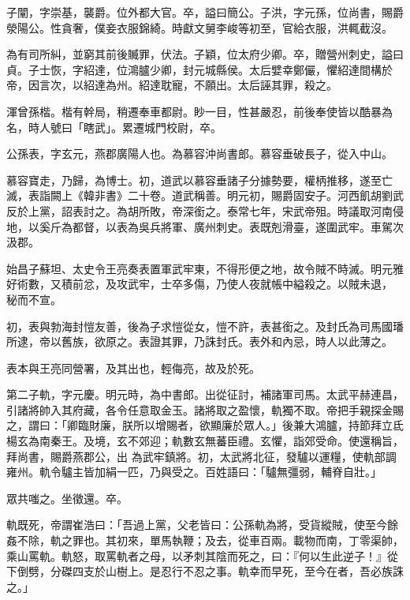 \begin{pinyinscope}
 子闡，字崇基，襲爵。位外都大官。卒，謚曰簡公。子洪，字元孫，位尚書，賜爵滎陽公。性貪奢，僕妾衣服錦綺。時獻文舅李峻等初至，官給衣服，洪輒截沒。



 為有司所糾，並窮其前後贓罪，伏法。子穎，位太府少卿。卒，贈營州刺史，謚曰貞。子士恢，字紹達，位鴻臚少卿，封元城縣侯。太后嬖幸鄭儼，懼紹達間構於帝，因言次，以紹達為州。紹達耽寵，不願出。太后誣其罪，殺之。



 渾曾孫楷。楷有幹局，稍遷奉車都尉。眇一目，性甚嚴忍，前後奉使皆以酷暴為名，時人號曰「瞎武」。累遷城門校尉，卒。



 公孫表，字玄元，燕郡廣陽人也。為慕容沖尚書郎。慕容垂破長子，從入中山。



 慕容寶走，乃歸，為博士。初，道武以慕容垂諸子分據勢要，權柄推移，遂至亡滅，表詣闕上《韓非書》二十卷。道武稱善。明元初，賜爵固安子。河西飢胡劉武反於上黨，詔表討之。為胡所敗，帝深銜之。泰常七年，宋武帝殂。時議取河南侵地，以奚斤為都督，以表為吳兵將軍、廣州刺史。表既剋滑臺，遂圍武牢。車駕次汲郡。



 始昌子蘇坦、太史令王亮奏表置軍武牢東，不得形便之地，故令賊不時滅。明元雅好術數，又積前忿，及攻武牢，士卒多傷，乃使人夜就帳中縊殺之。以賊未退，
 秘而不宣。



 初，表與勃海封愷友善，後為子求愷從女，愷不許，表甚銜之。及封氏為司馬國璠所逮，帝以舊族，欲原之。表證其罪，乃誅封氏。表外和內忌，時人以此薄之。



 表本與王亮同營署，及其出也，輕侮亮，故及於死。



 第二子軌，字元慶。明元時，為中書郎。出從征討，補諸軍司馬。太武平赫連昌，引諸將帥入其府藏，各令任意取金玉。諸將取之盈懷，軌獨不取。帝把手親探金賜之，謂曰：「卿臨財廉，朕所以增賜者，欲顯廉於眾人。」後兼大鴻臚，持節拜立氐楊玄為南秦王。及境，玄不郊迎；軌數玄無蕃臣禮。玄懼，詣郊受命。使還稱旨，拜尚書，賜爵燕郡公，出
 為武牢鎮將。初，太武將北征，發驢以運糧，使軌部調雍州。軌令驢主皆加絹一匹，乃與受之。百姓語曰：「驢無彊弱，輔脊自壯。」



 眾共嗤之。坐徵還。卒。



 軌既死，帝謂崔浩曰：「吾過上黨，父老皆曰：公孫軌為將，受貨縱賊，使至今餘姦不除，軌之罪也。其初來，單馬執鞭；及去，從車百兩。載物而南，丁零渠帥，乘山罵軌。軌怒，取罵軌者之母，以矛刺其陰而死之，曰：『何以生此逆子！』從下倒劈，分磔四支於山樹上。是忍行不忍之事。軌幸而早死，至今在者，吾必族誅之。」




\end{pinyinscope}

